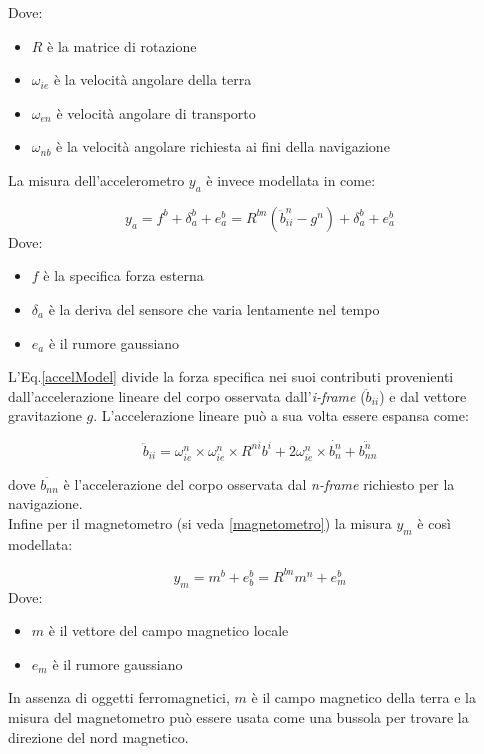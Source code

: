 Dove:
\begin{itemize}
	\item $ R$ è la matrice di rotazione
	\item $\omega_{ie}$ è la velocità angolare della terra
	\item $\omega_{en}$ è velocità angolare di transporto
	\item $\omega_{nb}$ è la velocità angolare richiesta ai fini della navigazione
\end{itemize}

La misura dell'accelerometro $y_a$ è invece modellata in \cite{gyromodel} come:

\begin{equation}
\label{accelModel}
 y_a = f^b + \delta_a^b + e_a^b = R^{bn} (\ddot{b}_{ii}^n - g^n) + \delta_a^b + e_a^b
\end{equation}
Dove:
\begin{itemize}
	\item $f$ è la specifica forza esterna
	\item $\delta_a$ è la deriva del sensore che varia lentamente nel tempo 
	\item $e_a$ è il rumore gaussiano
\end{itemize}
L'Eq.\ref{accelModel} divide la forza specifica nei suoi contributi provenienti dall'accelerazione lineare del corpo osservata dall'\textit{i-frame} ($\ddot{b}_{ii}$) e dal vettore gravitazione $g$. L'accelerazione lineare può a sua volta essere espansa come:

\begin{equation}
\ddot{b}_{ii} = \omega_{ie}^n \times \omega_{ie}^n \times R^{ni}b^i + 2\omega_{ie}^n \times \dot{b_n^n}+\ddot{b_{nn}^n}
\end{equation}

dove $\ddot{b_{nn}}$ è l'accelerazione del corpo osservata dal \textit{n-frame} richiesto per la navigazione.\\

Infine per il magnetometro (si veda \ref{magnetometro}) la misura $y_m$ è così modellata:

\begin{equation}
y_m = m^b + e_b^b = R^{bn} m^n + e_m^b
\end{equation}
Dove:
\begin{itemize}
	\item $m$ è il vettore del campo magnetico locale
	\item $e_m$ è il rumore gaussiano
\end{itemize}
In assenza di oggetti ferromagnetici, $m$ è il campo magnetico della terra e la misura del magnetometro può essere usata come una bussola per trovare la direzione del nord magnetico.







